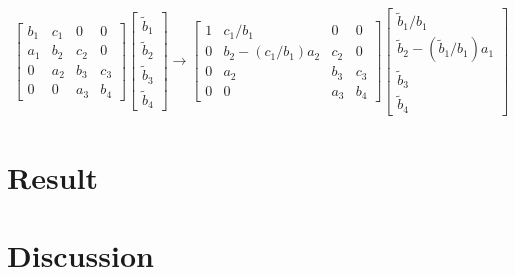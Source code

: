 \documentclass[12pt,norsk,a4paper]{article}
\begin{document}
\begin{align*}
\begin{bmatrix}
b_1 & c_1 & 0 & 0 \\ 
a_1 & b_2 & c_2 & 0 \\ 
0 & a_2 & b_3 & c_3 \\ 
0 & 0 & a_3 & b_4
\end{bmatrix}\begin{bmatrix}
\tilde{b}_1 \\ 
\tilde{b}_2 \\ 
\tilde{b}_3 \\ 
\tilde{b}_4
\end{bmatrix}\to
\begin{bmatrix}
1 & c_1/b_1 & 0 & 0 \\ 
0 & b_2-(c_1/b_1)a_2 & c_2 & 0 \\ 
0 & a_2 & b_3 & c_3 \\ 
0 & 0 & a_3 & b_4
\end{bmatrix}\begin{bmatrix}
\tilde{b}_1/b_1 \\ 
\tilde{b}_2-(\tilde{b}_1/b_1)a_1 \\ 
\tilde{b}_3 \\ 
\tilde{b}_4
\end{bmatrix}
\end{align*}


















\section{Result}
















\section{Discussion}
\end{document}
